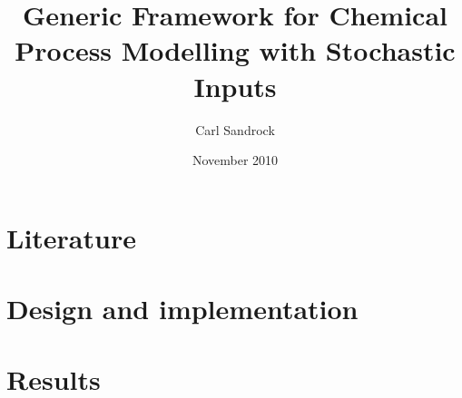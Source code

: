 \documentclass[a4paper, 12pt, %
pdftex]{report} %
\title{Generic Framework for Chemical Process Modelling with Stochastic Inputs}
\author{Carl Sandrock}
\date{November 2010}
\begin{document}



\pagestyle{headings}
\setcounter{page}{1}


\part{Literature}







\part{Design and implementation}


\part{Results}



\appendix
%
%
%
%


\end{document}
